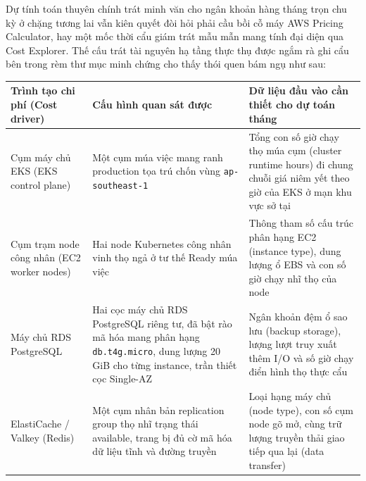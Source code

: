 Dự tính toán thuyên chính trát minh văn cho ngân khoản hàng tháng trọn
chu kỳ ở chặng tương lai vẫn kiên quyết đòi hỏi phải cầu bồi cỗ máy AWS
Pricing Calculator, hay một mốc thời cẩu giám trát mẫu mẫn mang tính đại
diện qua Cost Explorer. Thế cấu trát tài nguyên hạ tầng thực thụ được
ngắm rà ghi cẩu bên trong rèm thư mục minh chứng cho thấy thói quen bám
ngụ như sau:

{
\begingroup
\small
\setlength{\tabcolsep}{3pt}
\renewcommand{\arraystretch}{1.15}
\begin{longtable}{@{}
  >{\raggedright\arraybackslash}p{}
  >{\raggedright\arraybackslash}p{}
  >{\raggedright\arraybackslash}p{}@{}}
\toprule\noalign{}
\begin{minipage}[b]{\linewidth}\raggedright
Trình tạo chi phí (Cost driver)
\end{minipage} & \begin{minipage}[b]{\linewidth}\raggedright
Cấu hình quan sát được
\end{minipage} & \begin{minipage}[b]{\linewidth}\raggedright
Dữ liệu đầu vào cần thiết cho dự toán tháng
\end{minipage} \\
\midrule\noalign{}
\endhead
\bottomrule\noalign{}
\endlastfoot
Cụm máy chủ EKS (EKS control plane) & Một cụm múa việc mang ranh
production tọa trú chốn vùng \texttt{ap-\allowbreak{}southeast-\allowbreak{}1} & Tổng con số giờ
chạy thọ múa cụm (cluster runtime hours) đi chung chuỗi giá niêm yết
theo giờ của EKS ở mạn khu vực sở tại \\
Cụm trạm node công nhân (EC2 worker nodes) & Hai node Kubernetes công
nhân vinh thọ ngả ở tư thế Ready múa việc & Thông tham số cấu trúc phân
hạng EC2 (instance type), dung lượng ổ EBS và con số giờ chạy nhĩ thọ
của node \\
Máy chủ RDS PostgreSQL & Hai cọc máy chủ RDS PostgreSQL riêng tư, đã bật
rào mã hóa mang phân hạng \texttt{db.\allowbreak{}t4g.\allowbreak{}micro}, dung lượng 20 GiB cho
từng instance, trần thiết cọc Single-AZ & Ngân khoản đệm ổ sao lưu
(backup storage), lượng lượt truy xuất thêm I/O và số giờ chạy điển hình
thọ thực cẩu \\
ElastiCache / Valkey (Redis) & Một cụm nhân bản replication group thọ
nhĩ trạng thái available, trang bị đủ cờ mã hóa dữ liệu tĩnh và đường
truyền & Loại hạng máy chủ (node type), con số cụm node gõ mở, cùng trữ
lượng truyền thải giao tiếp qua lại (data transfer) \\

\end{longtable}}

